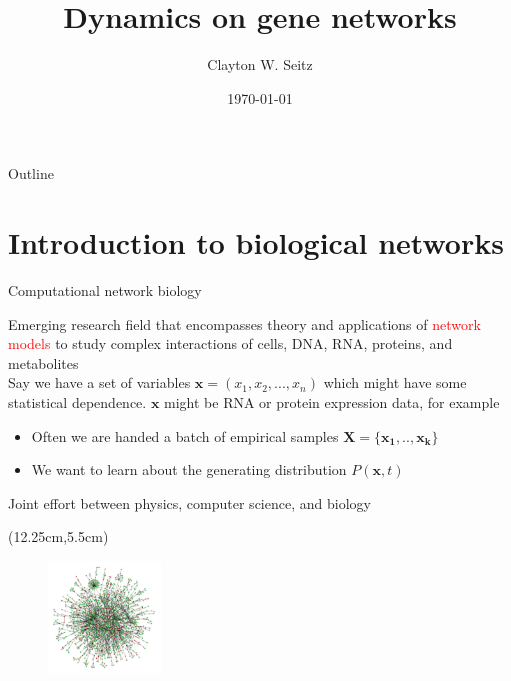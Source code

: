\documentclass[aspectratio=1610]{beamer}					%
\title{Dynamics on gene networks}	%
\author{Clayton W. Seitz}								%
\date{\today}									%
\begin{document}
\begin{frame}
  \titlepage
\end{frame}

\begin{frame}{Outline}
  \tableofcontents
\end{frame}

%

\section{Introduction to biological networks}

\begin{frame}{Computational network biology}

Emerging research field that encompasses theory and applications of \textcolor{red}{network models} to study complex interactions of cells, DNA, RNA, proteins, and metabolites\\
\vspace{0.2in}
Say we have a set of variables $\bm{x} = (x_{1},x_{2},...,x_{n})$ which might have some statistical dependence. $\bm{x}$ might be RNA or protein expression data, for example\\
\vspace{0.2in}
\begin{itemize}
\item Often we are handed a batch of empirical samples $\bm{X} = \{\bm{x_{1}},..,\bm{x_{k}}\}$
\item We want to learn about the generating distribution $P(\bm{x},t)$
\end{itemize}

\vspace{0.2in}
Joint effort between physics, computer science, and biology

\begin{textblock*}{3cm}(12.25cm,5.5cm)
\begin{figure}
\includegraphics[width=3cm]{net.png}
\end{figure}
\end{textblock*}

\end{frame}
\end{document}

